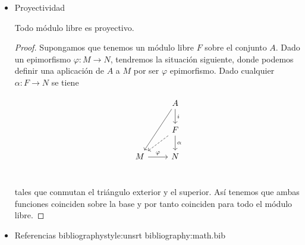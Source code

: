 \documentclass[11pt]{article}
\begin{document}
\begin{itemize}
\begin{itemize}
Y por la propiedad universal del anillo de polinomios, toda estructura
de $R[t]\text{-módulo}$ quedará determinada por el endomorfismo que asignemos a $t$.

\begin{lemma}
Dadas transformaciones lineales $\alpha,\beta$ de $F$; las estructuras como $R[t]\text{-módulo}$
son isomorfas si y sólo si $\alpha$ y $\beta$ son semejantes.
\end{lemma}
\begin{proof}
Si llamamos $F_{\alpha}$, $F_{\beta}$ a las dos estructuras como $R[t]\text{-módulo}$, tendremos que
un isomorfismo $\pi\colon F_{\alpha}\to F_{\beta}$ será lo mismo que una transformación invertible
$\pi\colon F \to F$ cumpliendo $\beta = \pi\circ\alpha\circ\pi^{-1}$.

Nótese de hecho que un isomorfismo entre módulos debe comportarse como

\[
\pi\circ\alpha (v) = \pi(tv) = t\pi(v) = \beta\circ\pi(v),
\]

por lo que $\pi\circ\alpha = \beta\circ\pi$ es la condición que lo distingue de cualquier
otra transformación lineal.
\end{proof}

\begin{corollary}
Hay una correspondencia biyectiva entre clases de semejanza de transformaciones
lineales de un $R\text{-módulo}$ libre $F$ y clases de isomorfía de estructuras de
$R[t]\text{-módulo}$ en $F$.
\end{corollary}

Nótese que esto se expande a las matrices en el caso finito-dimensional.
\end{itemize}

\item Proyectividad
\label{sec-7-5-3-7}
\begin{theorem}
Todo módulo libre es proyectivo.
\end{theorem}
\begin{proof}
Supongamos que tenemos un módulo libre $F$ sobre el conjunto $A$. Dado
un epimorfismo $\varphi\colon M \to N$, tendremos la situación siguiente, donde
podemos definir una aplicación de $A$ a $M$ por ser $\varphi$ epimorfismo.
Dado cualquier $\alpha\colon F \to N$ se tiene

\[\begin{tikzcd}
& A\dar{i}\ar{ddl} \\
& F\dar{\alpha}\dlar[dashed] \\
M\rar{\varphi} & N \\
\end{tikzcd}\]

tales que conmutan el triángulo exterior y el superior. Así tenemos
que ambas funciones coinciden sobre la base y por tanto coinciden
para todo el módulo libre.
\end{proof}
\item Referencias
\label{sec-7-5-3-8}
bibliographystyle:unsrt
bibliography:math.bib
\end{itemize}
\end{document}
